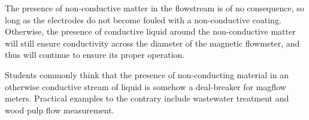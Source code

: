 \vskip 10pt

The presence of non-conductive matter in the flowstream is of no consequence, so long as the electrodes do not become fouled with a non-conductive coating.  Otherwise, the presence of conductive liquid around the non-conductive matter will still ensure conductivity across the diameter of the magnetic flowmeter, and thus will continue to ensure its proper operation.

Students commonly think that the presence of non-conducting material in an otherwise conductive stream of liquid is somehow a deal-breaker for magflow meters.  Practical examples to the contrary include wastewater treatment and wood pulp flow measurement.





